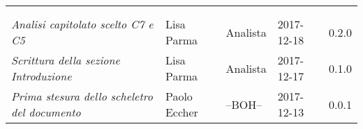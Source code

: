\newpage 
\section*{}
\begin{table}[H]
	\centering
	\begin{tabular}{p{4cm}|C{3cm}|C{3cm}|R{2.5cm}|R{2cm}}
		
		 & & & & \\
		
		
		\emph{}	 & & & & \\
		\hline
		
		\emph{Analisi capitolato scelto C7 e C5 } & Lisa Parma & Analista & 2017-12-18 & 0.2.0 \\
		\hline
		
		\emph{Scrittura della sezione Introduzione } & Lisa Parma & Analista & 2017-12-17 & 0.1.0 \\
		\hline
		
		\emph{Prima stesura dello scheletro del documento} & Paolo Eccher & --BOH-- & 2017-12-13 & 0.0.1 \\
		
	\end{tabular}
	
\end{table}


\clearpage